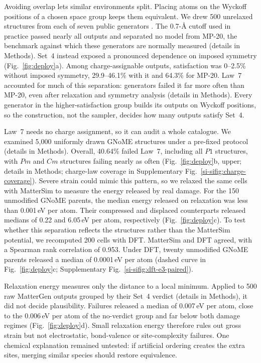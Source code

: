 Avoiding overlap lets similar environments split. Placing atoms on
the Wyckoff positions of a chosen space group keeps them equivalent. We drew 500 unrelaxed structures from
each of seven public generators
\cite{zeni2025generative,jiao2023crystal,okhotin2025miad,jiao2024space,cao2025space,levy2025symmcd,kazeev2025wyckoff}.
The 0.7-\AA{} cutoff used in practice passed nearly all outputs and separated no model from
MP-20, the benchmark against which these generators are normally measured (details in Methods).
Set~4 instead exposed a pronounced dependence on imposed symmetry
(Fig.~\ref{fig:deploy}a). Among charge-assignable outputs, satisfaction was 0--2.5\%
without imposed symmetry, 29.9--46.1\% with it and 64.3\% for MP-20. Law~7 accounted for
much of this separation: generators failed it far more often than MP-20, even after
relaxation and symmetry analysis (details in Methods).
Every generator in the higher-satisfaction group builds its outputs on Wyckoff positions,
so the construction, not the sampler, decides how many outputs satisfy Set~4.

Law~7 needs no charge assignment, so it can audit a whole catalogue. We examined 5{,}000 uniformly drawn GNoME structures under a pre-fixed protocol
(details in Methods). Overall, 40.64\% failed Law~7, including all \(P1\) structures, with \(Pm\) and \(Cm\) structures failing nearly as often (Fig.~\ref{fig:deploy}b, upper; details in Methods; charge-law
coverage in Supplementary Fig.~\ref{si-sifig:charge-coverage}). Severe strain could mimic
this pattern, so we relaxed the same cells with MatterSim \cite{yang2024mattersim} to
measure the energy released by real damage. For the 150
unmodified GNoME parents, the median energy released on relaxation was less than
0.001\,eV per atom. Their compressed and displaced counterparts released
medians of 0.22 and 6.05\,eV per atom, respectively (Fig.~\ref{fig:deploy}c). To test whether this separation reflects the structures rather than the MatterSim potential, we recomputed 200 cells with DFT. MatterSim and DFT agreed, with a Spearman rank correlation of 0.953. Under DFT, twenty unmodified GNoME parents released a median of
0.0001\,eV per atom (dashed curve in Fig.~\ref{fig:deploy}c; Supplementary
Fig.~\ref{si-sifig:dft-e3-paired}).

Relaxation energy measures only the distance to a local minimum. Applied to 500 raw
MatterGen outputs grouped by their Set~4 verdict (details in Methods), it did not decide
plausibility. Failures released a median of 0.007\,eV per atom, close to
the 0.006\,eV per atom of the no-verdict group and far below both damage regimes
(Fig.~\ref{fig:deploy}d). Small relaxation energy therefore rules out gross strain but not
electrostatic, bond-valence or site-complexity failures. One chemical explanation remained untested: if artificial ordering creates the extra sites, merging similar species should restore equivalence.

